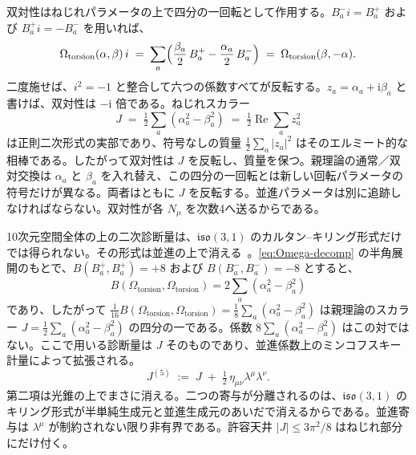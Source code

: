 \documentclass[a4paper]{article}
\begin{document}
双対性はねじれパラメータの上で四分の一回転として作用する。\(B^{-}_{a}i=B^{+}_{a}\) および \(B^{+}_{a}i=-B^{-}_{a}\) を用いれば、
\[
\Omega_{\mathrm{torsion}}(\alpha,\beta)\,i
\;=\;
\sum_{a}\Bigl(\frac{\beta_{a}}{2}\,B^{+}_{a}-\frac{\alpha_{a}}{2}\,B^{-}_{a}\Bigr)
\;=\;
\Omega_{\mathrm{torsion}}(\beta,-\alpha).
\]
二度施せば、\(i^{2}=-1\) と整合して六つの係数すべてが反転する。\(z_{a}=\alpha_{a}+\mathrm{i}\beta_{a}\) と書けば、双対性は \(-\mathrm{i}\) 倍である。ねじれスカラー
\[
J \;=\; \tfrac12\sum_{a}(\alpha_{a}^{2}-\beta_{a}^{2}) \;=\; \tfrac12\operatorname{Re}\sum_{a}z_{a}^{2}
\]
は正則二次形式の実部であり、符号なしの質量 \(\tfrac12\sum_{a}|z_{a}|^{2}\) はそのエルミート的な相棒である。したがって双対性は \(J\) を反転し、質量を保つ。親理論の通常／双対交換は \(\alpha_{a}\) と \(\beta_{a}\) を入れ替え、この四分の一回転とは新しい回転パラメータの符号だけが異なる。両者はともに \(J\) を反転する。並進パラメータは別に追跡しなければならない。双対性が各 \(N_{\mu}\) を次数4へ送るからである。

10次元空間全体の上の二次診断量は、\(\mathfrak{iso}(3,1)\) のカルタン--キリング形式だけでは得られない。その形式は並進の上で消える~\cite{FultonHarris1991,Humphreys1972}。\eqref{eq:Omega-decomp} の半角展開のもとで、\(B(B_{a}^{+},B_{a}^{+})=+8\) および \(B(B_{a}^{-},B_{a}^{-})=-8\) とすると、
\[
B(\Omega_{\mathrm{torsion}},\Omega_{\mathrm{torsion}})=2\sum_{a}(\alpha_{a}^{2}-\beta_{a}^{2})
\]
であり、したがって \(\tfrac1{16}B(\Omega_{\mathrm{torsion}},\Omega_{\mathrm{torsion}})=\tfrac18\sum_{a}(\alpha_{a}^{2}-\beta_{a}^{2})\) は親理論のスカラー \(J=\tfrac12\sum_{a}(\alpha_{a}^{2}-\beta_{a}^{2})\) の四分の一である。係数 \(8\sum_{a}(\alpha_{a}^{2}-\beta_{a}^{2})\) はこの対ではない。ここで用いる診断量は \(J\) そのものであり、並進係数上のミンコフスキー計量によって拡張される。
\begin{equation}
J^{(5)}
\;:=\;
J
\;+\;
\tfrac{1}{2}\,\eta_{\mu\nu}\lambda^{\mu}\lambda^{\nu}.
\label{eq:J5-invariant}
\end{equation}
第二項は光錐の上でまさに消える。二つの寄与が分離されるのは、\(\mathfrak{iso}(3,1)\) のキリング形式が半単純生成元と並進生成元のあいだで消えるからである。並進寄与は \(\lambda^{\mu}\) が制約されない限り非有界である。許容天井 \(|J|\le 3\pi^{2}/8\) はねじれ部分にだけ付く。
\end{document}
